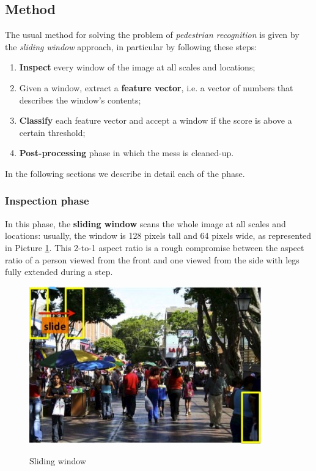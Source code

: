 \subsection{Method}
The usual method for solving the problem of \textit{pedestrian recognition} is given by the \textit{sliding window} approach, in particular by following these steps:

\begin{enumerate}
    \item \textbf{Inspect} every window of the image at all scales and locations;
    \item Given a window, extract a \textbf{feature vector}, i.e. a vector of numbers that describes the window's contents;
    \item \textbf{Classify} each feature vector and accept a window if the score is above a certain threshold;
    \item \textbf{Post-processing} phase in which the mess is cleaned-up.
\end{enumerate}

In the following sections we describe in detail each of the phase.

\subsubsection{Inspection phase}
In this phase, the \textbf{sliding window} scans the whole image at all scales and locations: usually, the window is 128 pixels tall and 64 pixels wide, as represented in Picture \ref{sliding_window}. This 2-to-1 aspect ratio is a rough compromise between the aspect ratio of a person viewed from the front and one viewed from the side with legs fully extended during a step.

\begin{figure}[h!]
		\centering
		\includegraphics[scale = 1.5]{img/sliding window.jpg}
        \label{sliding_window}
        \caption{Sliding window}
\end{figure}

